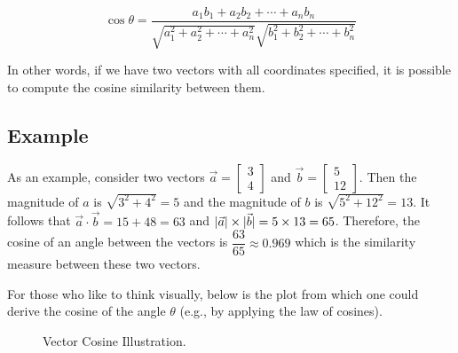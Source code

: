 \documentclass[11pt]{article}
\DeclarePairedDelimiter\abs{\lvert}{\rvert}
\begin{document}
\[ \cos\theta = \dfrac{a_1b_1 + a_2b_2 + \cdots + a_nb_n}{\sqrt{a_1^2 + a_2^2 + \cdots + a_n^2}\sqrt{b_1^2 + b_2^2 + \cdots + b_n^2}} \]

In other words, if we have two vectors with all coordinates specified, it is
possible to compute the cosine similarity between them.

\subsection{Example}

As an example, consider two vectors
\(\vec{a} = \begin{bmatrix}3 \\ 4\end{bmatrix}\)
and \(\vec{b} = \begin{bmatrix}5 \\ 12\end{bmatrix}\).
Then the magnitude of \(a\) is \(\sqrt{3^2 + 4^2} = 5\) and the magnitude of
\(b\) is \(\sqrt{5^2 + 12^2} = 13\). It follows that
\(\vec{a} \cdot \vec{b} = 15 + 48 = 63\) and
\(\abs{\vec{a}} \times \abs{\vec{b}} = 5 \times 13 = 65\). Therefore, the
cosine of an angle between the vectors is \(\dfrac{63}{65} \approx 0.969\)
which is the similarity measure between these two vectors.

\bigskip

For those who like to think visually, below is the plot from which one could
derive the cosine of the angle $\theta$ (e.g., by applying the law of cosines).

\begin{figure}[H]
  \begin{center}
  \end{center}
  \caption{Vector Cosine Illustration.}
\end{figure}
\end{document}
